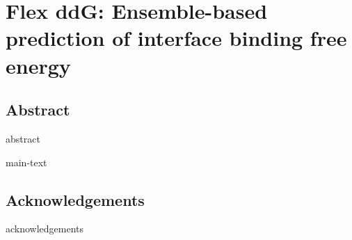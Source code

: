 \chapter{Flex ddG: Ensemble-based prediction of interface binding free energy}
\label{chapter:flex-ddG}

\section{Abstract}
{abstract}

{main-text}

\section{Acknowledgements}
{acknowledgements}
